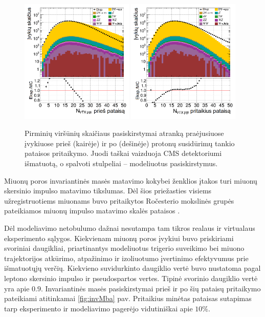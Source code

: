 \documentclass[a4paper, 12pt, oneside]{article}
\begin{document}
\begin{figure}[H]
	\includegraphics[width=0.48\textwidth]{Kursinis3/mumu_nVTX_before.png}
	\includegraphics[width=0.48\textwidth]{Kursinis3/mumu_nVTX_after.png}
	\caption{\label{fig:PUba} Pirminių viršūnių skaičiaus pasiskirstymai atranką praėjusiuose įvykiuose prieš (kairėje)
		ir po (dešinėje) protonų susidūrimų tankio pataisos pritaikymo.
		Juodi taškai vaizduoja CMS detektoriumi išmatuotą, o spalvoti stulpeliai -- modeliuotus pasiskirstymus.}
\end{figure}

Miuonų poros invariantinės masės matavimo kokybei ženklios įtakos turi miuonų skersinio impulso matavimo tikslumas.
Dėl šios priežasties visiems užregistruotiems miuonams buvo pritaikytos Ročesterio mokslinės grupės pateikiamos
miuonų impulso matavimo skalės pataisos \cite{RocCorr}.

Dėl modeliavimo netobulumo dažnai nesutampa tam tikros realaus ir virtualaus eksperimento sąlygos.
Kiekvienam miuonų poros įvykiui buvo priskiriami svoriniai daugikliai, priartinantys modeliuotus trigerio
suveikimo bei miuono trajektorijos atkūrimo, atpažinimo ir izoliuotumo įvertinimo efektyvumus prie išmatuotųjų verčių.
Kiekvieno suvidurkinto daugiklio vertė buvo nustatoma pagal leptono skersinio impulso ir pseudospartos vertes.
Tipinė svorinio daugiklio vertė yra apie $0.9$.
Invariantinės masės pasiskirstymai prieš ir po šių pataisų pritaikymo pateikiami atitinkamai \ref{fig:invMba} pav.
Pritaikius minėtas pataisas sutapimas tarp eksperimento ir modeliavimo pagerėjo vidutiniškai apie $10\%$.
\end{document}
